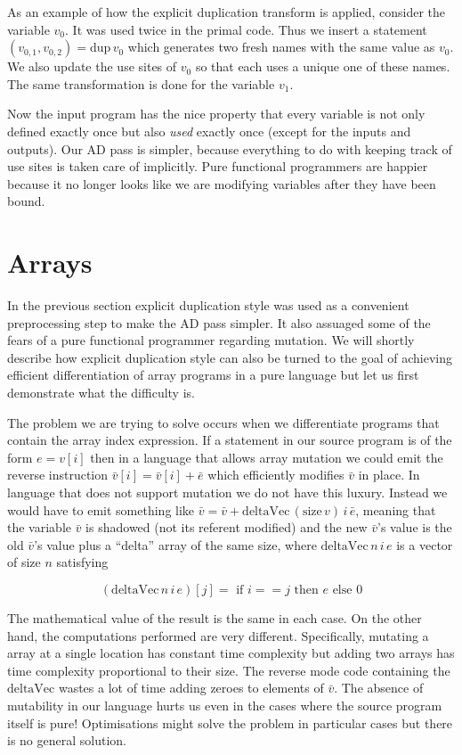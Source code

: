 \documentclass[12pt]{article}
\begin{document}
As an example of how the explicit duplication transform is applied,
consider the variable $v_0$.  It was used twice in the primal code.
Thus we insert a statement $(v_{0,1}, v_{0,2}) = \mathrm{dup} \, v_0$
which generates two fresh names with the same value as $v_0$.  We also
update the use sites of $v_0$ so that each uses a unique one of these
names.  The same transformation is done for the variable $v_1$.

Now the input program has the nice property that every variable is not
only defined exactly once but also \emph{used} exactly once (except
for the inputs and outputs).  Our AD pass is simpler, because
everything to do with keeping track of use sites is taken care of
implicitly.  Pure functional programmers are happier because it no
longer looks like we are modifying variables after they have been
bound.

\section{Arrays}

In the previous section explicit duplication style was used as a
convenient preprocessing step to make the AD pass simpler.  It also
assuaged some of the fears of a pure functional programmer regarding
mutation.  We will shortly describe how explicit duplication style can
also be turned to the goal of achieving efficient differentiation of
array programs in a pure language but let us first demonstrate what
the difficulty is.

The problem we are trying to solve occurs when we differentiate
programs that contain the array index expression.  If a statement in
our source program is of the form $e = v[i]$ then in a language that
allows array mutation we could emit the reverse instruction
$\bar{v}[i] = \bar{v}[i] + \bar{e}$ which efficiently modifies
$\bar{v}$ in place.  In language that does not support mutation we do
not have this luxury.  Instead we would have to emit something like
$\bar{v} = \bar{v} + \textrm{deltaVec} \, (\textrm{size} \, v) \, i \,
\bar{e}$, meaning that the variable $\bar{v}$ is shadowed (not its
referent modified) and the new $\bar{v}$'s value is the old
$\bar{v}$'s value plus a ``delta'' array of the same size, where
$\textrm{deltaVec} \, n \, i \, e$ is a vector of size $n$ satisfying

\[
(\textrm{deltaVec} \, n \, i \, e)[j]
= \textrm{ if } i == j \textrm{ then } e  \textrm{ else } 0
\]

The mathematical value of the result is the same in each case.  On the
other hand, the computations performed are very different.
Specifically, mutating a array at a single location has constant time
complexity but adding two arrays has time complexity proportional to
their size.  The reverse mode code containing the $\textrm{deltaVec}$
wastes a lot of time adding zeroes to elements of $\bar{v}$.  The
absence of mutability in our language hurts us even in the cases where
the source program itself is pure!  Optimisations might solve the
problem in particular cases but there is no general solution.
\end{document}
